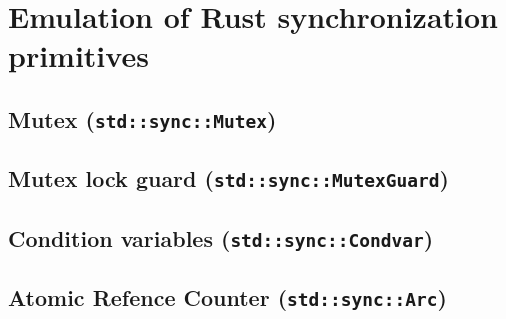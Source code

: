 \section{Emulation of Rust synchronization primitives}

\subsection{Mutex (\texttt{std::sync::Mutex})}

\subsection{Mutex lock guard (\texttt{std::sync::MutexGuard})}

\subsection{Condition variables (\texttt{std::sync::Condvar})}

\subsection{Atomic Refence Counter (\texttt{std::sync::Arc})}

\bigskip